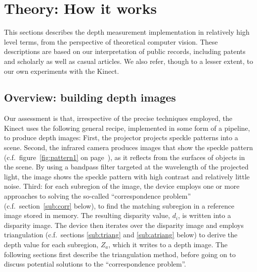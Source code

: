 \section{Theory: How it works}
\label{howitworks}

This sections describes the depth measurement implementation in relatively
high level terms, from the perspective of theoretical computer vision. These
descriptions are based on our interpretation of public records, including
patents and scholarly as well as casual articles. We also refer, though to a
lesser extent, to our own experiments with the Kinect.


\subsection{Overview: building depth images}

Our assessment is that, irrespective of the precise techniques employed, the
Kinect uses the following general recipe, implemented in some form of a
pipeline, to produce depth images: First, the projector projects speckle
patterns into a scene. Second, the infrared camera produces images that show the
speckle pattern (c.f.\ figure~\ref{fig:pattern1} on
page~\pageref{fig:pattern1}), as it reflects from the surfaces of objects in the
scene. By using a bandpass filter targeted at the wavelength of the projected
light, the image shows the speckle pattern with high contrast and relatively
little noise. Third: for each subregion of the image, the device employs one or
more approaches to solving the so-called ``correspondence problem'' (c.f.\
section~\ref{sub:corr} below), to find the matching subregion in a reference
image stored in memory. The resulting disparity value, $d_i$, is written into a
disparity image. The device then iterates over the disparity image and employs
triangulation (c.f.\ sections \ref{sub:triang} and \ref{sub:atriang} below) to
derive the depth value for each subregion, $Z_a$, which it writes to a depth
image. The following sections first describe the triangulation method, before
going on to discuss potential solutions to the ``correspondence problem''.


